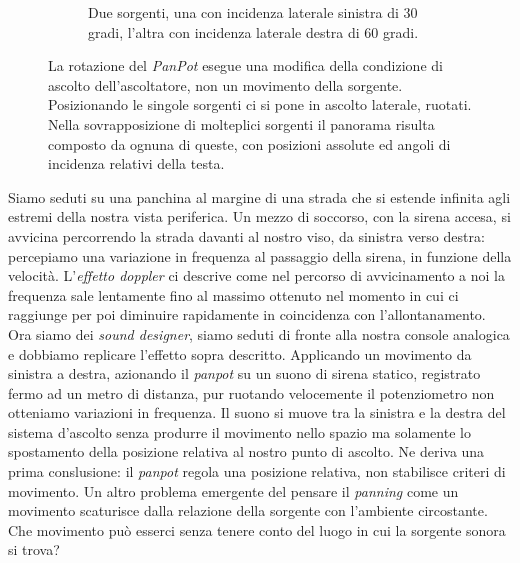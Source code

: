 \begin{figure}[t!]
\begin{subfigure}[t]{0.9\textwidth}
        \caption[]{Due sorgenti, una con incidenza laterale sinistra di 30 gradi,
        l'altra con incidenza laterale destra di 60 gradi.}
        \label{pan:both}
    \end{subfigure}
    \caption[]{La rotazione del \emph{PanPot} esegue una modifica della condizione
    di ascolto dell'ascoltatore, non un movimento della sorgente. Posizionando
    le singole sorgenti ci si pone in ascolto laterale, ruotati. Nella
    sovrapposizione di molteplici sorgenti il panorama risulta composto da
    ognuna di queste, con posizioni assolute ed angoli di incidenza relativi
    della testa.}
    \label{pan:all}
\end{figure}

Siamo seduti su una panchina al
margine di una strada che si estende infinita agli estremi della nostra vista
periferica. Un mezzo di soccorso, con la sirena accesa, si avvicina percorrendo
la strada davanti al nostro viso, da sinistra verso destra: percepiamo
una variazione in frequenza al passaggio della sirena, in funzione della
velocità. L'\emph{effetto doppler} ci descrive come nel percorso di
avvicinamento a noi la frequenza sale lentamente fino al massimo ottenuto nel
momento in cui ci raggiunge per poi diminuire rapidamente in coincidenza con
l'allontanamento. Ora siamo dei \emph{sound designer}, siamo seduti di fronte alla nostra console
analogica e dobbiamo replicare l'effetto sopra descritto. Applicando un
movimento da sinistra a destra, azionando il \emph{panpot} su un suono di sirena
statico, registrato fermo ad un metro di distanza, pur ruotando velocemente il
potenziometro non otteniamo variazioni in frequenza. Il suono si muove tra la
sinistra e la destra del sistema d'ascolto senza produrre il movimento nello
spazio ma solamente lo spostamento della posizione relativa al nostro punto di
ascolto. Ne deriva una prima conslusione: il \emph{panpot} regola una posizione
relativa, non stabilisce criteri di movimento. Un altro problema emergente del
pensare il \emph{panning} come un movimento
scaturisce dalla relazione della sorgente con l'ambiente circostante. Che
movimento può esserci senza tenere conto del luogo in cui la sorgente sonora si
trova?

